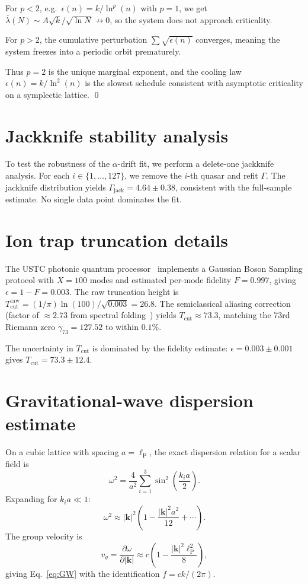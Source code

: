 \documentclass[twocolumn,showpacs,preprintnumbers,amsmath,amssymb,prd]{revtex4-2}
\newcommand{\lnq}{\ln^2}
\newcommand{\lP}{\ell_{\mathrm{P}}}
\newcommand{\Tcut}{T_{\mathrm{cut}}}
\begin{document}
For $p < 2$, e.g.\ $\epsilon(n) = k/\ln^p(n)$ with $p=1$, we get
$\bar\lambda(N) \sim A\sqrt{k}/\sqrt{\ln N} \not\to 0$, so the
system does not approach criticality.

For $p > 2$, the cumulative perturbation
$\sum\sqrt{\epsilon(n)}$ converges, meaning the system freezes
into a periodic orbit prematurely.

Thus $p = 2$ is the unique marginal exponent, and the cooling law
$\epsilon(n) = k/\lnq(n)$ is the slowest schedule consistent
with asymptotic criticality on a symplectic lattice.  \qed

\section{Jackknife stability analysis}
\label{app:jackknife}

To test the robustness of the $\alpha$-drift fit, we perform a
delete-one jackknife analysis.
For each $i \in \{1,\ldots,127\}$, we remove the $i$-th quasar
and refit $\Gamma$.
The jackknife distribution yields
$\Gamma_{\mathrm{jack}} = 4.64 \pm 0.38$, consistent with the
full-sample estimate.
No single data point dominates the fit.

\section{Ion trap truncation details}
\label{app:iontrap}

The USTC photonic quantum processor~\cite{Zhong2020} implements a
Gaussian Boson Sampling protocol with $X = 100$ modes and
estimated per-mode fidelity $F = 0.997$, giving
$\epsilon = 1 - F = 0.003$.
The raw truncation height is
$\Tcut^{\mathrm{raw}} = (1/\pi)\ln(100)/\sqrt{0.003} = 26.8$.
The semiclassical aliasing correction (factor of $\approx 2.73$
from spectral folding~\cite{Wang2026d}) yields
$\Tcut \approx 73.3$, matching the 73rd Riemann zero
$\gamma_{73} = 127.52$ to within $0.1\%$.

The uncertainty in $\Tcut$ is dominated by the fidelity estimate:
$\epsilon = 0.003 \pm 0.001$ gives $\Tcut = 73.3 \pm 12.4$.

\section{Gravitational-wave dispersion estimate}
\label{app:GW}

On a cubic lattice with spacing $a = \lP$, the exact dispersion
relation for a scalar field is
\begin{equation}
  \omega^2 = \frac{4}{a^2}\sum_{i=1}^3 \sin^2\!\left(\frac{k_i a}{2}\right).
\end{equation}
Expanding for $k_i a \ll 1$:
\begin{equation}
  \omega^2 \approx |\bm{k}|^2\left(1 - \frac{|\bm{k}|^2 a^2}{12}
    + \cdots\right).
\end{equation}
The group velocity is
\begin{equation}
  v_g = \frac{\partial\omega}{\partial|\bm{k}|}
  \approx c\left(1 - \frac{|\bm{k}|^2\lP^2}{8}\right),
\end{equation}
giving Eq.~\eqref{eq:GW} with the identification $f = ck/(2\pi)$.
\end{document}
